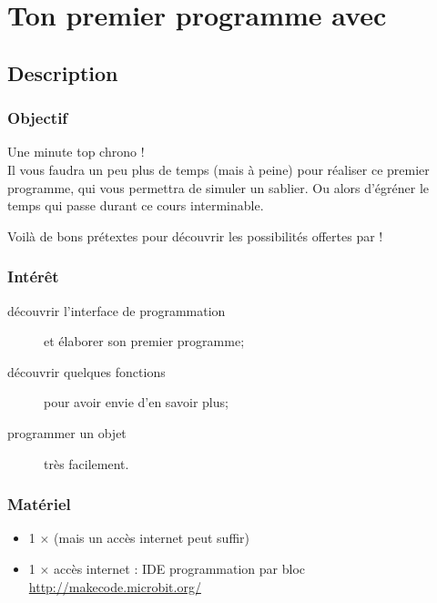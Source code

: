 
\section{Ton premier programme avec \mb}

\subsection{Description}

\subsubsection{Objectif}

\begin{formule}
Une minute top chrono !\\
Il vous faudra un peu plus de temps (mais à peine) pour réaliser ce premier programme, qui vous permettra de simuler un sablier. Ou alors d'égréner le temps qui passe durant ce cours interminable.

Voilà de bons prétextes pour découvrir les possibilités offertes par  \mb !
\end{formule}


\subsubsection{Intérêt}

\begin{description}
    \item [découvrir l'interface de programmation] et élaborer son premier programme;
    \item [découvrir quelques fonctions] pour avoir envie d'en savoir plus;
    \item [programmer un objet] très facilement.
\end{description}


\subsubsection{Matériel}
\begin{itemize}
    \item 1 $\times$ \matosMb (mais un accès internet peut suffir)
    \item 1 $\times$ accès internet : IDE programmation par bloc \url{http://makecode.microbit.org/}
\end{itemize}


